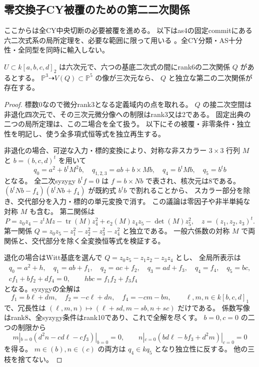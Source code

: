 \subsection{零交換子CY被覆のための第二二次関係}
\label{subsec:cubic-CY-second-quadric}
ここからは全CY中央切断の必要被覆を進める。
以下はas4の固定commitにある六二次式系の局所定理を、必要な範囲に限って用いる
\cite{AS4CYpinned}。全CY分類・AS十分性・全同型を同時に輸入しない。

\begin{proposition}\label{prop:cubic-CY-six-quadrics-second}
$U\subset k[a,b,c,d]_2$ は六次元で、六つの基底二次式の間にrank6の二次関係 $Q$ があるとする。
$\mathbb P^3\dashrightarrow V(Q)\subset\mathbb P^5$ の像が三次元なら、
$Q$ と独立な第二の二次関係が存在する。
\end{proposition}
\begin{proof}
標数0なので微分rank3となる定義域内の点を取れる。
$Q$ の接二次空間は非退化四次元で、その三次元微分像への制限はrank3又は2である。
固定出典の二つの局所定理は、この二場合を全て扱う。
以下にその被覆・非零条件・独立性を明記し、使う全多項式恒等式を独立再生する。

非退化の場合、可逆な入力・標的変換により、対称な非スカラー $3\times3$ 行列 $M$ と
$b=(b,c,d)^t$ を用いて
\[
 q_0=a^2+b^tM^2b,\quad q_{1,2,3}=ab+b\times Mb,\quad
 q_4=b^tMb,\quad q_5=b^tb
\]
となる。
全二次syzygy $b^tf=0$ は $f=b\times Nb$ で表され、核次元は8である。
$(b^tNb-f_4)(b^tNb+f_4)$ が既約式 $b^tb$ で割れることから、
スカラー部分を除き、交代部分を入力・標的の単元変換で消す。
この議論は零因子や非半単純な対称 $M$ も含む。
第二関係は
\[
 P=z_0z_4-z^tMz-\operatorname{tr}(M)z_4^2
    +e_2(M)z_4z_5-\det(M)z_5^2,
 \quad z=(z_1,z_2,z_3)^t.
\]
第一関係 $Q=z_0z_5-z_1^2-z_2^2-z_3^2-z_4^2$ と独立である。
一般六係数の対称 $M$ で両関係と、交代部分を除く全変換恒等式を検証する。

退化の場合はWitt基底を選んで $Q=z_0z_5-z_1z_2-z_3z_4$ とし、
全局所表示は
\[
\begin{gathered}
 q_0=a^2+h,\quad q_1=ab+f_1,\quad q_2=ac+f_2,\quad
 q_3=ad+f_3,\quad q_4=f_4,\quad q_5=bc,\\
 cf_1+bf_2+df_4=0,\qquad hbc=f_1f_2+f_3f_4
\end{gathered}
\]
となる。syzygyの全解は
\[
 f_1=b\ell+dm,\quad f_2=-c\ell+dn,\quad f_4=-cm-bn,
 \qquad \ell,m,n\in k[b,c,d]_1
\]
で、冗長性は $(\ell,m,n)\mapsto(\ell+sd,m-sb,n+sc)$ だけである。
係数写像はrank8、全syzygy条件はrank10であり、これで全解を尽くす。
$b=0,c=0$ の二つの制限から
\[
 m|_{b=0}(d^2n-cd\ell-cf_3)|_{b=0}=0,\qquad
 n|_{c=0}(bd\ell-bf_3+d^2m)|_{c=0}=0
\]
を得る。
$m\in(b),n\in(c)$ の両方は $q_4\in kq_5$ となり独立性に反する。
他の三枝を捨てない。


\end{proof}
